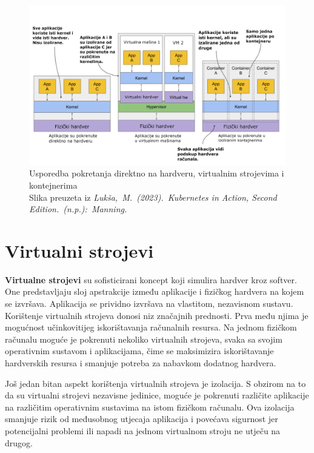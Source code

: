 \documentclass[times, utf8, diplomski]{fer}
\begin{document}
\begin{figure}[htb]
	\centering
	\includegraphics[width=15cm]{images/infra.png}
	\caption[Usporedba pokretanja direktno na hardveru, virtualnim strojevima i kontejnerima]{Usporedba pokretanja direktno na hardveru, virtualnim strojevima i kontejnerima\\Slika preuzeta iz \emph{Lukša, M. (2023). Kubernetes in Action, Second Edition. (n.p.): Manning.}}
	\label{fig:infra}
\end{figure}

\section{Virtualni strojevi}

\textbf{Virtualne strojevi}  su sofisticirani koncept koji simulira hardver kroz softver. One predstavljaju sloj apstrakcije između aplikacije i fizičkog hardvera na kojem se izvršava. Aplikacija se prividno izvršava na vlastitom, nezavisnom sustavu. \\

Korištenje virtualnih strojeva donosi niz značajnih prednosti. Prva među njima je mogućnost učinkovitijeg iskorištavanja računalnih resursa. Na jednom fizičkom računalu moguće je pokrenuti nekoliko virtualnih strojeva, svaka sa svojim operativnim sustavom i aplikacijama, čime se maksimizira iskorištavanje hardverskih resursa i smanjuje potreba za nabavkom dodatnog hardvera.

Još jedan bitan aspekt korištenja virtualnih strojeva je izolacija. S obzirom na to da su virtualni strojevi nezavisne jedinice, moguće je pokrenuti različite aplikacije na različitim operativnim sustavima na istom fizičkom računalu. Ova izolacija smanjuje rizik od međusobnog utjecaja aplikacija i povećava sigurnost jer potencijalni problemi ili napadi na jednom virtualnom stroju ne utječu na drugog.
\end{document}
